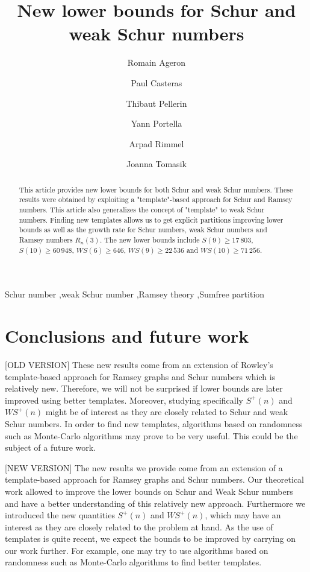 \documentclass[3p]{elsarticle}
\title{New lower bounds for Schur and weak Schur numbers}
\author[1]{Romain Ageron\fnref{fn1}}
\author[1]{Paul Casteras\fnref{fn1}}
\author[1]{Thibaut Pellerin\fnref{fn1}}
\author[1]{Yann Portella\fnref{fn1}}
\author[2]{Arpad Rimmel\fnref{fn2}}
\author[2]{Joanna Tomasik\corref{cor1}\fnref{fn2}}
\newtheorem{computational theorem}[definition]{Computational Theorem}
\newcommand{\WS}{\mathit{WS}}
\begin{document}
\begin{abstract}

This article provides new lower bounds for both Schur and weak Schur numbers. These results were obtained by 
exploiting a "template"-based approach for Schur and Ramsey numbers. This article also generalizes the concept 
of "template" to weak Schur numbers. Finding new templates allows us to get explicit partitions improving lower bounds 
as well as the growth rate for Schur numbers, weak Schur numbers and Ramsey numbers \(R_n(3)\). The new lower 
bounds include \(S(9) \geqslant 17\,803\), \(S(10) \geqslant 60\,948\), \(\WS(6) \geqslant 646\), \(\WS (9) \geqslant 22\,536\) and 
\(\WS (10) \geqslant 71\,256 \).

\end{abstract}

\begin{keyword}
Schur number \sep weak Schur number \sep Ramsey theory \sep Sumfree partition
\end{keyword}

\maketitle







\section{Conclusions and future work}

[OLD VERSION] These new results come from an extension of Rowley's template-based approach for Ramsey graphs and 
Schur numbers which is relatively new. Therefore, we will not be surprised if lower bounds are later improved 
using better templates. Moreover, studying specifically \(S^+(n)\) and \(\WS^+(n)\) might be of interest as they
 are closely related to Schur and weak Schur numbers. In order to find new templates, algorithms based on 
randomness such as Monte-Carlo algorithms may prove to be very useful. This could be the subject of a future work.

[NEW VERSION] The new results we provide come from an extension of a template-based approach for Ramsey graphs
and Schur numbers. Our theoretical work allowed to improve the lower bounds on Schur and Weak Schur numbers and have
a better understanding of this relatively new approach. Furthermore we introduced the new quantities \(S^+(n)\) and
\(\WS^+(n)\), which may have an interest as they are closely related to the problem at hand. As the use of templates
is quite recent, we expect the bounds to be improved by carrying on our work further. For example, one may try to use
algorithms based on randomness such as Monte-Carlo algorithms to find better templates.
\end{document}
